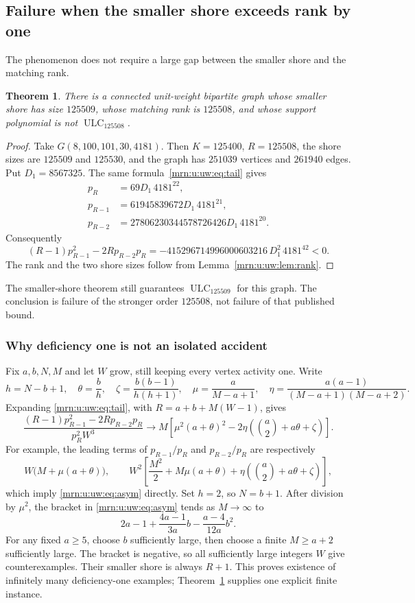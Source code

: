 \documentclass[11pt,a4paper]{article}
\newtheorem{theorem}{Theorem}[section]
\theoremstyle{remark}\newtheorem{remark}[theorem]{Remark}
\newcommand{\ULC}{\operatorname{ULC}}      %
\begin{document}
\subsection{Failure when the smaller shore exceeds rank by one}
The phenomenon does not require a large gap between the smaller shore and the matching rank.

\begin{theorem}\label{mrn:u:uw:thm:defone}
There is a connected unit-weight bipartite graph whose smaller shore has size $125509$, whose matching rank is $125508$, and whose support polynomial is not $\ULC_{125508}$.
\end{theorem}
\begin{proof}
Take $G(8,100,101,30,4181)$. Then $K=125400$, $R=125508$, the shore sizes are $125509$ and $125530$, and the graph has $251039$ vertices and $261940$ edges. Put $D_1=8567325$. The same formula~\eqref{mrn:u:uw:eq:tail} gives
\begin{align*}
 p_R&=69D_1\,4181^{22},\\
 p_{R-1}&=61945839672D_1\,4181^{21},\\
 p_{R-2}&=27806230344578726426D_1\,4181^{20}.
\end{align*}
Consequently
\[
 (R-1)p_{R-1}^2-2Rp_{R-2}p_R
 =-415296714996000603216\,D_1^2\,4181^{42}<0.
\]
The rank and the two shore sizes follow from Lemma~\ref{mrn:u:uw:lem:rank}.
\end{proof}

The smaller-shore theorem \cite{b:RU} still guarantees $\ULC_{125509}$ for this graph. The conclusion is failure of the stronger order $125508$, not failure of that published bound.

\subsubsection{Why deficiency one is not an isolated accident}
Fix $a,b,N,M$ and let $W$ grow, still keeping every vertex activity one. Write
\[
 h=N-b+1,\quad \theta=\frac bh,\quad
 \zeta=\frac{b(b-1)}{h(h+1)},\quad
 \mu=\frac a{M-a+1},\quad
 \eta=\frac{a(a-1)}{(M-a+1)(M-a+2)}.
\]
Expanding \eqref{mrn:u:uw:eq:tail}, with $R=a+b+M(W-1)$, gives
\begin{equation}\label{mrn:u:uw:eq:asym}
 \frac{(R-1)p_{R-1}^2-2Rp_{R-2}p_R}{p_R^2 W^3}
 \longrightarrow
 M\left[\mu^2(a+\theta)^2
 -2\eta\left(\binom a2+a\theta+\zeta\right)\right].
\end{equation}
For example, the leading terms of $p_{R-1}/p_R$ and $p_{R-2}/p_R$ are respectively
\[
 W\bigl(M+\mu(a+\theta)\bigr),\qquad
 W^2\left[\frac{M^2}{2}+M\mu(a+\theta)
       +\eta\left(\binom a2+a\theta+\zeta\right)\right],
\]
which imply \eqref{mrn:u:uw:eq:asym} directly.
Set $h=2$, so $N=b+1$. After division by $\mu^2$, the bracket in \eqref{mrn:u:uw:eq:asym} tends as $M\to\infty$ to
\[
 2a-1+\frac{4a-1}{3a}b-\frac{a-4}{12a}b^2.
\]
For any fixed $a\ge5$, choose $b$ sufficiently large, then choose a finite $M\ge a+2$ sufficiently large. The bracket is negative, so all sufficiently large integers $W$ give counterexamples. Their smaller shore is always $R+1$. This proves existence of infinitely many deficiency-one examples; Theorem~\ref{mrn:u:uw:thm:defone} supplies one explicit finite instance.
\end{document}
